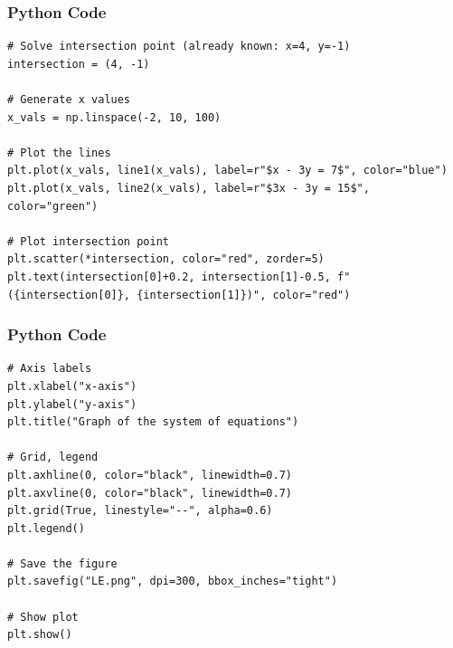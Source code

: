 \documentclass{beamer}
\begin{document}
 \begin{frame}[fragile]
\frametitle{Python Code }
\begin{lstlisting}
# Solve intersection point (already known: x=4, y=-1)
intersection = (4, -1)

# Generate x values
x_vals = np.linspace(-2, 10, 100)

# Plot the lines
plt.plot(x_vals, line1(x_vals), label=r"$x - 3y = 7$", color="blue")
plt.plot(x_vals, line2(x_vals), label=r"$3x - 3y = 15$", color="green")

# Plot intersection point
plt.scatter(*intersection, color="red", zorder=5)
plt.text(intersection[0]+0.2, intersection[1]-0.5, f"({intersection[0]}, {intersection[1]})", color="red")
\end{lstlisting}
\end{frame}


 \begin{frame}[fragile]
\frametitle{Python Code }
\begin{lstlisting}
# Axis labels
plt.xlabel("x-axis")
plt.ylabel("y-axis")
plt.title("Graph of the system of equations")

# Grid, legend
plt.axhline(0, color="black", linewidth=0.7)
plt.axvline(0, color="black", linewidth=0.7)
plt.grid(True, linestyle="--", alpha=0.6)
plt.legend()

# Save the figure
plt.savefig("LE.png", dpi=300, bbox_inches="tight")

# Show plot
plt.show()
\end{lstlisting}
\end{frame}
\end{document}

